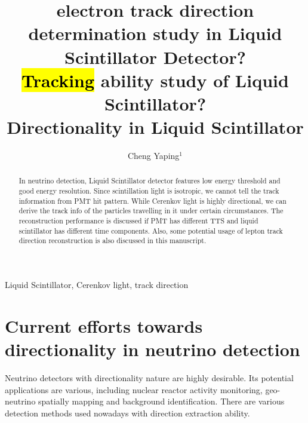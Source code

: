 \documentclass[a4paper,10pt]{cpc-hepnp}
\begin{document}
\title{electron track direction determination study in Liquid Scintillator
Detector? \\  \hl{Tracking} ability study of Liquid Scintillator?
\\
Directionality in Liquid Scintillator}

\author{%
      Cheng Yaping$^{1}$%
}
\maketitle
\address{%
$^1$ Institute of High Energy Physics, Chinese
        Academy of Sciences, Beijing 100049, China\\
}


\begin{abstract}
In neutrino detection,
Liquid Scintillator detector features low energy threshold
and good energy resolution. Since scintillation light is isotropic,
we cannot tell the track information from PMT hit pattern.
While Cerenkov light is highly directional, we can derive the track
info of the particles travelling in it under certain circumstances.
The reconstruction performance is discussed if PMT has different TTS and
liquid scintillator has different time components. Also, some potential
usage of lepton track direction reconstruction is also discussed in this manuscript.
\end{abstract}


\begin{keyword}
Liquid Scintillator, Cerenkov light, track direction
\end{keyword}



\tableofcontents
\section{Current efforts towards directionality in neutrino detection}
Neutrino detectors with directionality nature are highly desirable.
Its potential applications are various, including nuclear reactor activity monitoring,
geo-neutrino spatially mapping and background identification.
There are various detection methods used nowadays with direction extraction
ability.
\end{document}
